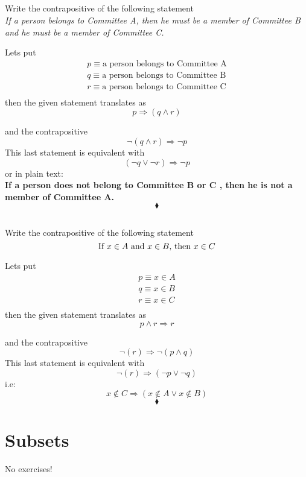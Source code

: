 \subsection{}
\begin{tcolorbox}
Write the contrapositive of the following statement\\
\textit{If a person belongs to Committee A, then he must be a member of Committee B and he must be a member of Committee C.}
\end{tcolorbox}
Lets put 
\begin{align*}
p\equiv \text{a person belongs to Committee A}\\
q\equiv \text{a person belongs to Committee B}\\
r\equiv \text{a person belongs to Committee C}\\
\end{align*}
then the given statement translates as 
$$p\Rightarrow (q\wedge r)$$

and the contrapositive 
$$\lnot (q\wedge r)\Rightarrow \lnot p$$
This last statement is equivalent with 
$$(\lnot q\vee \lnot r)\Rightarrow \lnot p$$ or in plain text:\\
\textbf{If a person does not belong to Committee B or C , then he is not  a member of Committee A.}
$$\blacklozenge$$

\subsection{}
\begin{tcolorbox}
Write the contrapositive of the following statement\\
$$\text{If } x\in A \text{ and } x\in B\text{, then } x \in C$$
\end{tcolorbox}
Lets put 
\begin{align*}
p\equiv x\in A\\
q\equiv x\in B\\
r\equiv x\in C\\
\end{align*}
then the given statement translates as 
$$p\wedge r\Rightarrow r$$

and the contrapositive 
$$\lnot (r)\Rightarrow \lnot (p\wedge q)$$
This last statement is equivalent with 
$$\lnot (r)\Rightarrow (\lnot p\vee \lnot q)$$ i.e:\\
$$x\notin C \Rightarrow (x\notin A \vee x\notin B)$$
$$\blacklozenge$$
\newpage
\section{Subsets}
No exercises!
